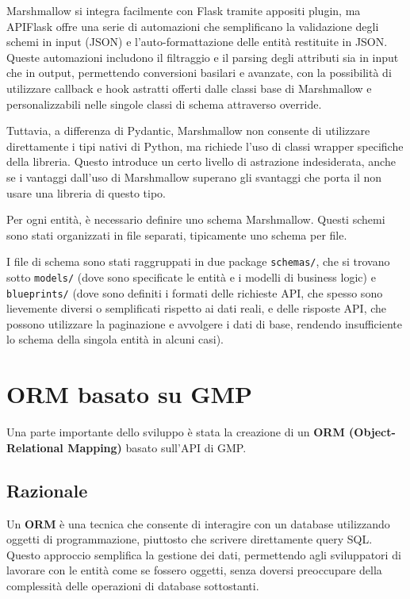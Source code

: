 Marshmallow si integra facilmente con Flask tramite appositi plugin, ma APIFlask offre una serie di automazioni che semplificano la validazione degli schemi in input (JSON) e l'auto-formattazione delle entità restituite in JSON. Queste automazioni includono il filtraggio e il parsing degli attributi sia in input che in output, permettendo conversioni basilari e avanzate, con la possibilità di utilizzare callback e hook astratti offerti dalle classi base di Marshmallow e personalizzabili nelle singole classi di schema attraverso override.

Tuttavia, a differenza di Pydantic, Marshmallow non consente di utilizzare direttamente i tipi nativi di Python, ma richiede l'uso di classi wrapper specifiche della libreria. Questo introduce un certo livello di astrazione indesiderata, anche se i vantaggi dall'uso di Marshmallow superano gli svantaggi che porta il non usare una libreria di questo tipo.

Per ogni entità, è necessario definire uno schema Marshmallow. Questi schemi sono stati organizzati in file separati, tipicamente uno schema per file.

I file di schema sono stati raggruppati in due package \texttt{schemas/}, che si trovano sotto \texttt{models/} (dove sono specificate le entità e i modelli di business logic) e \texttt{blueprints/} (dove sono definiti i formati delle richieste API, che spesso sono lievemente diversi o semplificati rispetto ai dati reali, e delle risposte API, che possono utilizzare la paginazione e avvolgere i dati di base, rendendo insufficiente lo schema della singola entità in alcuni casi).

\section{ORM basato su GMP}
Una parte importante dello sviluppo è stata la creazione di un \textbf{ORM (Object-Relational Mapping)} basato sull'API di GMP.

\subsection{Razionale}
Un \textbf{ORM} è una tecnica che consente di interagire con un database utilizzando oggetti di programmazione, piuttosto che scrivere direttamente query SQL. Questo approccio semplifica la gestione dei dati, permettendo agli sviluppatori di lavorare con le entità come se fossero oggetti, senza doversi preoccupare della complessità delle operazioni di database sottostanti.

